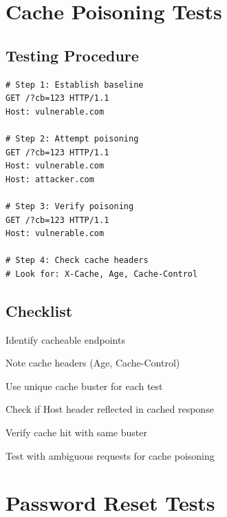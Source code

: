 \documentclass[12pt,a4paper]{article}
\begin{document}
\section{Cache Poisoning Tests}

\subsection{Testing Procedure}
\begin{lstlisting}[caption=Cache Poisoning Test Sequence]
# Step 1: Establish baseline
GET /?cb=123 HTTP/1.1
Host: vulnerable.com

# Step 2: Attempt poisoning
GET /?cb=123 HTTP/1.1
Host: vulnerable.com
Host: attacker.com

# Step 3: Verify poisoning
GET /?cb=123 HTTP/1.1
Host: vulnerable.com

# Step 4: Check cache headers
# Look for: X-Cache, Age, Cache-Control
\end{lstlisting}

\subsection{Checklist}
\begin{checklistbox}
 Identify cacheable endpoints
\end{checklistbox}
\begin{checklistbox}
 Note cache headers (Age, Cache-Control)
\end{checklistbox}
\begin{checklistbox}
 Use unique cache buster for each test
\end{checklistbox}
\begin{checklistbox}
 Check if Host header reflected in cached response
\end{checklistbox}
\begin{checklistbox}
 Verify cache hit with same buster
\end{checklistbox}
\begin{checklistbox}
 Test with ambiguous requests for cache poisoning
\end{checklistbox}

\section{Password Reset Tests}
\end{document}
